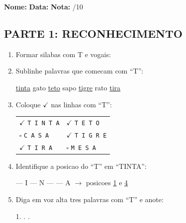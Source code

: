 \begin{exercicio}
\noindent\textbf{Nome:} \underline{\hspace{3.2cm}} \quad \textbf{Data:} \underline{\hspace{1.6cm}} \quad \textbf{Nota:} \underline{\hspace{0.9cm}}/10

\subsection*{PARTE 1: RECONHECIMENTO}

\begin{enumerate}
  \item Formar silabas com T e vogais:
  \begin{center}
   \quad {} \quad {} \quad {} \quad {}
  \end{center}

  \item Sublinhe palavras que comecam com ``T'':
  \begin{center}
  \uline{tinta} \quad gato \quad \uline{teto} \quad sapo \quad \uline{tigre} \quad rato \quad \uline{tira}
  \end{center}

  \item Coloque $\checkmark$ nas linhas com ``T'':
  \begin{center}
  \begin{tabular}{ll}
  $\checkmark$ \texttt{T I N T A} & $\checkmark$ \texttt{T E T O} \\
  $\square$ \texttt{C A S A} & $\checkmark$ \texttt{T I G R E} \\
  $\checkmark$ \texttt{T I R A} & $\square$ \texttt{M E S A}
  \end{tabular}
  \end{center}

  \item Identifique a posicao do ``T'' em ``TINTA'':
  \begin{center}
   --- I --- N ---  --- A $\rightarrow$ posicoes \underline{1} e \underline{4}
  \end{center}

  \item Diga em voz alta tres palavras com ``T'' e anote:
  \begin{center}
  1. \underline{\hspace{4cm}} . \underline{\hspace{4cm}} . \underline{\hspace{4cm}}
  \end{center}
\end{enumerate}


\end{exercicio}

